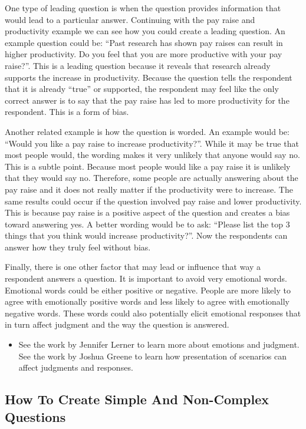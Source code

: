 \documentclass[]{book}
\providecommand{\tightlist}{%
  \setlength{\itemsep}{0pt}\setlength{\parskip}{0pt}}
\theoremstyle{definition}
\theoremstyle{definition}
\theoremstyle{definition}
\theoremstyle{remark}
\begin{document}
One type of leading question is when the question provides information
that would lead to a particular answer. Continuing with the pay raise
and productivity example we can see how you could create a leading
question. An example question could be: ``Past research has shown pay
raises can result in higher productivity. Do you feel that you are more
productive with your pay raise?''. This is a leading question because it
reveals that research already supports the increase in productivity.
Because the question tells the respondent that it is already ``true'' or
supported, the respondent may feel like the only correct answer is to
say that the pay raise has led to more productivity for the respondent.
This is a form of bias.

Another related example is how the question is worded. An example would
be: ``Would you like a pay raise to increase productivity?''. While it
may be true that most people would, the wording makes it very unlikely
that anyone would say no. This is a subtle point. Because most people
would like a pay raise it is unlikely that they would say no. Therefore,
some people are actually answering about the pay raise and it does not
really matter if the productivity were to increase. The same results
could occur if the question involved pay raise and lower productivity.
This is because pay raise is a positive aspect of the question and
creates a bias toward answering yes. A better wording would be to ask:
``Please list the top 3 things that you think would increase
productivity?''. Now the respondents can answer how they truly feel
without bias.

Finally, there is one other factor that may lead or influence that way a
respondent answers a question. It is important to avoid very emotional
words. Emotional words could be either positive or negative. People are
more likely to agree with emotionally positive words and less likely to
agree with emotionally negative words. These words could also
potentially elicit emotional responses that in turn affect judgment and
the way the question is answered.

\begin{itemize}
\tightlist
\item
  See the work by Jennifer Lerner to learn more about emotions and
  judgment. See the work by Joshua Greene to learn how presentation of
  scenarios can affect judgments and responses.
\end{itemize}

\hypertarget{how-to-create-simple-and-non-complex-questions}{%
\subsection{How To Create Simple And Non-Complex
Questions}\label{how-to-create-simple-and-non-complex-questions}}
\end{document}
